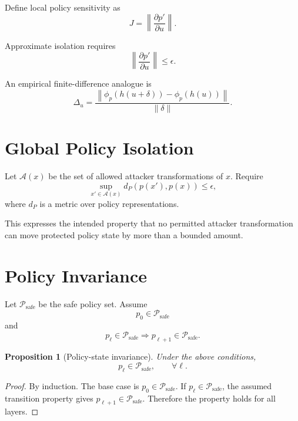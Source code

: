 \documentclass[11pt]{article}
\newcommand{\A}{\mathcal{A}}
\newcommand{\Psafe}{\mathcal{P}_{\mathrm{safe}}}
\newtheorem{proposition}{Proposition}
\begin{document}
Define local policy sensitivity as
\begin{equation}
J=
\left\|
\frac{\partial p'}{\partial u}
\right\|.
\end{equation}

Approximate isolation requires
\begin{equation}
\boxed{
\left\|
\frac{\partial p'}{\partial u}
\right\|\leq\epsilon.
}
\end{equation}

An empirical finite-difference analogue is
\begin{equation}
\Delta_u=
\frac{
\left\|\phi_p(h(u+\delta))-\phi_p(h(u))\right\|
}{
\|\delta\|
}.
\end{equation}

\section{Global Policy Isolation}

Let $\A(x)$ be the set of allowed attacker transformations of $x$. Require
\begin{equation}
\boxed{
\sup_{x'\in\A(x)}
d_P\!\left(p(x'),p(x)\right)\leq\epsilon,
}
\end{equation}
where $d_P$ is a metric over policy representations.

This expresses the intended property that no permitted attacker transformation
can move protected policy state by more than a bounded amount.

\section{Policy Invariance}

Let $\Psafe$ be the safe policy set. Assume
\begin{equation}
p_0\in\Psafe
\end{equation}
and
\begin{equation}
p_\ell\in\Psafe
\Longrightarrow
p_{\ell+1}\in\Psafe.
\end{equation}

\begin{proposition}[Policy-state invariance]
Under the above conditions,
\begin{equation}
\boxed{
p_\ell\in\Psafe,\qquad\forall\ell.
}
\end{equation}
\end{proposition}

\begin{proof}
By induction. The base case is $p_0\in\Psafe$. If $p_\ell\in\Psafe$, the
assumed transition property gives $p_{\ell+1}\in\Psafe$. Therefore the
property holds for all layers.
\end{proof}
\end{document}
